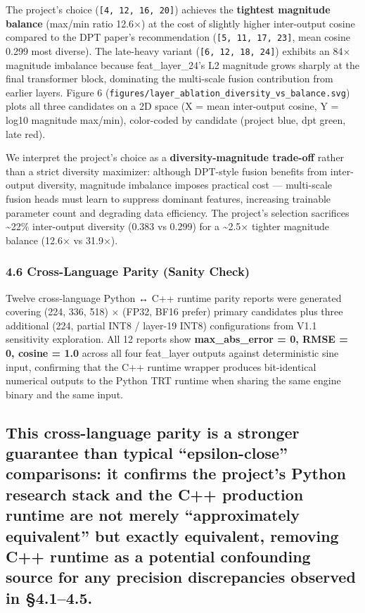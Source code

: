 \documentclass[
]{article}
\begin{document}
The project's choice (\texttt{{[}4,\ 12,\ 16,\ 20{]}}) achieves the
\textbf{tightest magnitude balance} (max/min ratio 12.6×) at the cost of
slightly higher inter-output cosine compared to the DPT paper's
recommendation (\texttt{{[}5,\ 11,\ 17,\ 23{]}}, mean cosine 0.299 most
diverse). The late-heavy variant (\texttt{{[}6,\ 12,\ 18,\ 24{]}})
exhibits an 84× magnitude imbalance because feat\_layer\_24's L2
magnitude grows sharply at the final transformer block, dominating the
multi-scale fusion contribution from earlier layers. Figure 6
(\texttt{figures/layer\_ablation\_diversity\_vs\_balance.svg}) plots all
three candidates on a 2D space (X = mean inter-output cosine, Y = log10
magnitude max/min), color-coded by candidate (project blue, dpt green,
late red).

We interpret the project's choice as a \textbf{diversity-magnitude
trade-off} rather than a strict diversity maximizer: although DPT-style
fusion benefits from inter-output diversity, magnitude imbalance imposes
practical cost --- multi-scale fusion heads must learn to suppress
dominant features, increasing trainable parameter count and degrading
data efficiency. The project's selection sacrifices \textasciitilde22\%
inter-output diversity (0.383 vs 0.299) for a \textasciitilde2.5×
tighter magnitude balance (12.6× vs 31.9×).

\subsubsection{4.6 Cross-Language Parity (Sanity
Check)}\label{cross-language-parity-sanity-check}

Twelve cross-language Python ↔ C++ runtime parity reports were generated
covering (224, 336, 518) × (FP32, BF16 prefer) primary candidates plus
three additional (224, partial INT8 / layer-19 INT8) configurations from
V1.1 sensitivity exploration. All 12 reports show
\textbf{max\_abs\_error = 0, RMSE = 0, cosine = 1.0} across all four
feat\_layer outputs against deterministic sine input, confirming that
the C++ runtime wrapper produces bit-identical numerical outputs to the
Python TRT runtime when sharing the same engine binary and the same
input.

\subsection{This cross-language parity is a stronger guarantee than
typical ``epsilon-close'' comparisons: it confirms the project's Python
research stack and the C++ production runtime are not merely
``approximately equivalent'' but exactly equivalent, removing C++
runtime as a potential confounding source for any precision
discrepancies observed in
§4.1--4.5.}\label{this-cross-language-parity-is-a-stronger-guarantee-than-typical-epsilon-close-comparisons-it-confirms-the-projects-python-research-stack-and-the-c-production-runtime-are-not-merely-approximately-equivalent-but-exactly-equivalent-removing-c-runtime-as-a-potential-confounding-source-for-any-precision-discrepancies-observed-in-4.14.5.}
\end{document}
